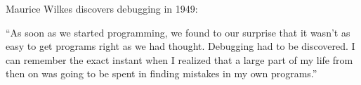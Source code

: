 \documentclass[aspectratio=169,usenames,dvipsnames]{beamer}
\begin{document}
\begin{frame}




    Maurice Wilkes discovers debugging in 1949:

    \vspace{1em}
    ``As soon as we started programming, we found to our surprise that it
    wasn't as easy to get programs right as we had thought. Debugging had to be
    discovered. I can remember the exact instant when I realized that a large
    part of my life from then on was going to be spent in finding mistakes in
    my own programs.''
    
\end{frame}
\end{document}
